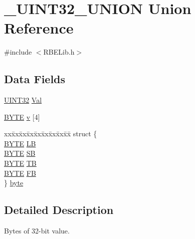 \hypertarget{union___u_i_n_t32___u_n_i_o_n}{\section{\+\_\+\+U\+I\+N\+T32\+\_\+\+U\+N\+I\+O\+N Union Reference}
\label{union___u_i_n_t32___u_n_i_o_n}
}


{\ttfamily \#include $<$R\+B\+E\+Lib.\+h$>$}

\subsection*{Data Fields}
\begin{DoxyCompactItemize}
\item 
\hyperlink{_r_b_e_lib_8h_a69afa2e50b905f4eab1f2df8a3fd9f23}{U\+I\+N\+T32} \hyperlink{union___u_i_n_t32___u_n_i_o_n_ab75b466902605ee16a8e44ee10db0803}{Val}
\item 
\hyperlink{_r_b_e_lib_8h_aec93e83855ac17c3c25c55c37ca186dd}{B\+Y\+T\+E} \hyperlink{union___u_i_n_t32___u_n_i_o_n_aadb5068d7d5639b99483f01440276f7c}{v} \mbox{[}4\mbox{]}
\item 
\begin{tabbing}
xx\=xx\=xx\=xx\=xx\=xx\=xx\=xx\=xx\=\kill
struct \{\\
\>\hyperlink{_r_b_e_lib_8h_aec93e83855ac17c3c25c55c37ca186dd}{BYTE} \hyperlink{union___u_i_n_t32___u_n_i_o_n_a26a4ac8e62f96c793f49c63db79b7d30}{LB}\\
\>\hyperlink{_r_b_e_lib_8h_aec93e83855ac17c3c25c55c37ca186dd}{BYTE} \hyperlink{union___u_i_n_t32___u_n_i_o_n_a28f45401359a496faf9b5eceaec380af}{SB}\\
\>\hyperlink{_r_b_e_lib_8h_aec93e83855ac17c3c25c55c37ca186dd}{BYTE} \hyperlink{union___u_i_n_t32___u_n_i_o_n_a003631647c4358c166cce519ae617ba8}{TB}\\
\>\hyperlink{_r_b_e_lib_8h_aec93e83855ac17c3c25c55c37ca186dd}{BYTE} \hyperlink{union___u_i_n_t32___u_n_i_o_n_a1c6a4ae906c3d72305edc761c57614b3}{FB}\\
\} \hyperlink{union___u_i_n_t32___u_n_i_o_n_adfc039b253823821842a05d37a9690e3}{byte}\\

\end{tabbing}\end{DoxyCompactItemize}


\subsection{Detailed Description}
Bytes of 32-\/bit value. 

